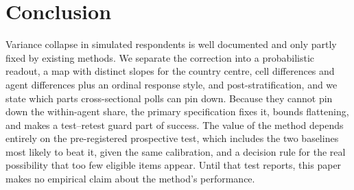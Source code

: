 \documentclass[11pt]{article}
\begin{document}
\section{Conclusion}
Variance collapse in simulated respondents is well documented and only partly fixed by existing methods. We separate the correction into a probabilistic readout, a map with distinct slopes for the country centre, cell differences and agent differences plus an ordinal response style, and post-stratification, and we state which parts cross-sectional polls can pin down. Because they cannot pin down the within-agent share, the primary specification fixes it, bounds flattening, and makes a test--retest guard part of success. The value of the method depends entirely on the pre-registered prospective test, which includes the two baselines most likely to beat it, given the same calibration, and a decision rule for the real possibility that too few eligible items appear. Until that test reports, this paper makes no empirical claim about the method's performance.




\appendix
\end{document}
